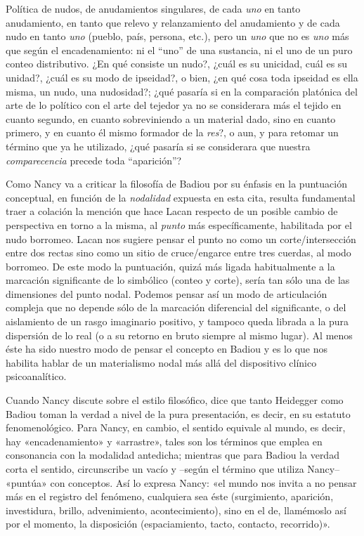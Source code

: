 Política de nudos, de anudamientos singulares, de cada \emph{uno} en tanto anudamiento, en tanto que relevo y relanzamiento del anudamiento y de cada nudo en tanto \emph{uno} (pueblo, país, persona, etc.), pero un \emph{uno} que no es \emph{uno} más que según el encadenamiento: ni el ``uno'' de una sustancia, ni el uno de un puro conteo distributivo. ¿En qué consiste un nudo?, ¿cuál es su unicidad, cuál es su unidad?, ¿cuál es su modo de ipseidad?, o bien, ¿en qué cosa toda ipseidad es ella misma, un nudo, una nudosidad?; ¿qué pasaría si en la comparación platónica del arte de lo político con el arte del tejedor ya no se considerara más el tejido en cuanto segundo, en cuanto sobreviniendo a un material dado, sino en cuanto primero, y en cuanto él mismo formador de la \emph{res}?, o aun, y para retomar un término que ya he utilizado, ¿qué pasaría si se considerara que nuestra \emph{comparecencia} precede toda ``aparición''?

Como Nancy va a criticar la filosofía de Badiou por su énfasis en la puntuación conceptual, en función de la \emph{nodalidad} expuesta en esta cita, resulta fundamental traer a colación la mención que hace Lacan respecto de un posible cambio de perspectiva en torno a la misma, al \emph{punto} más específicamente, habilitada por el nudo borromeo. Lacan nos sugiere pensar el punto no como un corte/intersección entre dos rectas sino como un sitio de cruce/engarce entre tres cuerdas, al modo borromeo. De este modo la puntuación, quizá más ligada habitualmente a la marcación significante de lo simbólico (conteo y corte), sería tan sólo una de las dimensiones del punto nodal. Podemos pensar así un modo de articulación compleja que no depende sólo de la marcación diferencial del significante, o del aislamiento de un rasgo imaginario positivo, y tampoco queda librada a la pura dispersión de lo real (o a su retorno en bruto siempre al mismo lugar). Al menos éste ha sido nuestro modo de pensar el concepto en Badiou y es lo que nos habilita hablar de un materialismo nodal más allá del dispositivo clínico psicoanalítico.

Cuando Nancy discute sobre el estilo filosófico, dice que tanto Heidegger como Badiou toman la verdad a nivel de la pura presentación, es decir, en su estatuto fenomenológico. Para Nancy, en cambio, el sentido equivale al mundo, es decir, hay «encadenamiento» y «arrastre», tales son los términos que emplea en consonancia con la modalidad antedicha; mientras que para Badiou la verdad corta el sentido, circunscribe un vacío y --según el término que utiliza Nancy-- «puntúa» con conceptos. Así lo expresa Nancy: «el mundo nos invita a no pensar más en el registro del fenómeno, cualquiera sea éste (surgimiento, aparición, investidura, brillo, advenimiento, acontecimiento), sino en el de, llamémoslo así por el momento, la disposición (espaciamiento, tacto, contacto, recorrido)».

